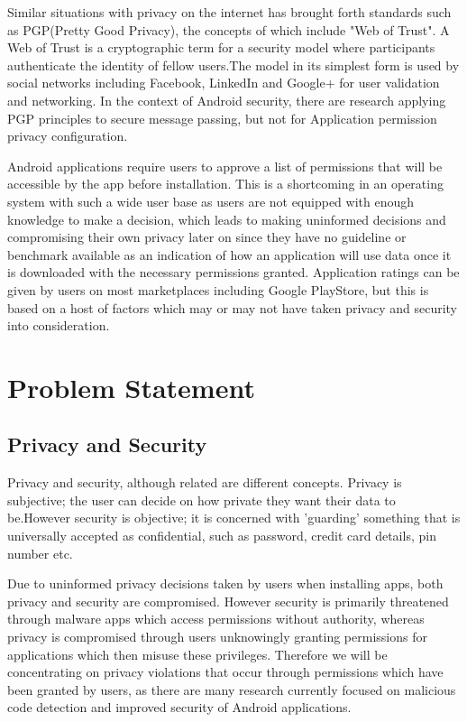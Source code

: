 Similar situations with privacy on the internet has brought forth standards such as PGP(Pretty Good Privacy), the concepts of which include "Web of Trust". A Web of Trust is a cryptographic term for a security model where participants authenticate the identity of fellow users.The model in its simplest form is used by social networks including Facebook, LinkedIn and Google+ for user validation and networking\cite{d}. In the context of Android security, there are research applying PGP principles to secure message passing, but not for Application permission privacy configuration\cite{aziz2012android}. 
\smallskip

Android applications require users to approve a list of permissions that will be accessible by the app before installation. This is a shortcoming in an operating system with such a wide user base as users are not equipped with enough knowledge to make a decision, which leads to making uninformed decisions and compromising their own privacy later on since they have no guideline or benchmark available as an indication of how an application will use data once it is downloaded with the necessary permissions granted. Application ratings can be given by users on most marketplaces including Google PlayStore, but this is based on a host of factors which may or may not have taken privacy and security into consideration.

\section{Problem Statement}

\subsection{Privacy and Security}

Privacy and security, although related are different concepts. Privacy is subjective; the user can decide on how private they want their data to be.However security is objective; it is concerned with 'guarding' something that is universally accepted as confidential, such as password, credit card details, pin number etc.
\smallskip

Due to uninformed privacy decisions taken by users when installing apps, both privacy and security are compromised. However security is primarily threatened through malware apps which access permissions without authority, whereas privacy is compromised through users unknowingly granting permissions for applications which then misuse these privileges. Therefore we will be concentrating on privacy violations that occur through permissions which have been granted by users, as there are many research currently focused on malicious code detection and improved security of Android applications.
\smallskip

